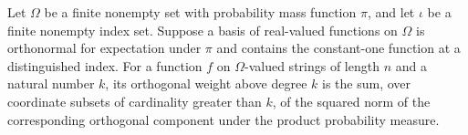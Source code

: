 \begin{definition}
\label{FABL.FiniteFourierBasis.orthogonalWeightAboveDegree}
\leanok
{}
Let $\Omega$ be a finite nonempty set with probability mass function $\pi$, and let
$\iota$ be a finite nonempty index set. Suppose a basis of real-valued functions on
$\Omega$ is orthonormal for expectation under $\pi$ and contains the constant-one
function at a distinguished index. For a function $f$ on $\Omega$-valued strings of
length $n$ and a natural number $k$, its orthogonal weight above degree $k$ is the sum,
over coordinate subsets of cardinality greater than $k$, of the squared norm of the
corresponding orthogonal component under the product probability measure.
\end{definition}

